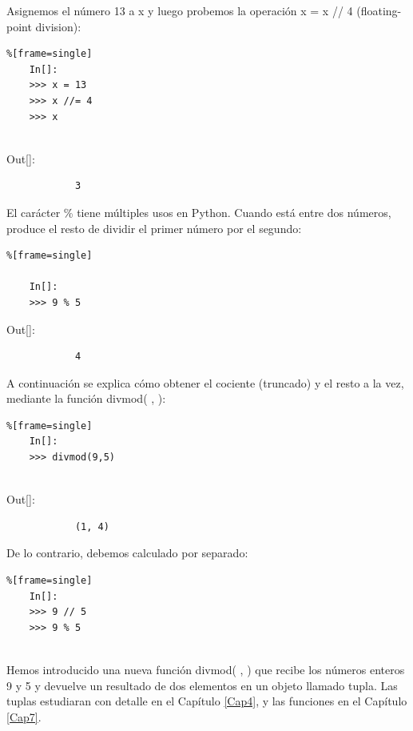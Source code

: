 \hspace{-0.65cm}Asignemos el número  13  a  {\ttfamily x} y luego probemos la operación   {\ttfamily x = x // 4}  (floating-point division):

\begin{lstlisting}%[frame=single]
	In[]:	
	>>> x = 13
	>>> x //= 4
	>>> x
	
\end{lstlisting}

{\ttfamily\scriptsize\scriptsize 
	\hspace{-0.65cm}Out[]:\vspace{-0.15cm}	
	{\color{blue} 	
		\begin{verbatim}
			3
		\end{verbatim}
}}

El carácter  {\hspace{0.1cm}}{\ttfamily \%} tiene múltiples usos en Python. Cuando está entre dos números, produce
el resto de dividir el primer número por el segundo:

\begin{lstlisting}%[frame=single]
	
	In[]:
	>>> 9 % 5	
\end{lstlisting}

{\ttfamily\scriptsize\scriptsize 
	\hspace{-0.65cm}Out[]:\vspace{-0.15cm}	
	{\color{blue} 	
		\begin{verbatim}
			4
		\end{verbatim}
}}

A continuación se explica cómo obtener el cociente (truncado) y el resto a la vez, mediante la función {
	\ttfamily divmod( , )}:

\begin{lstlisting}%[frame=single]
	In[]:	
	>>> divmod(9,5)
	
\end{lstlisting}

{\ttfamily\scriptsize\scriptsize 
	\hspace{-0.65cm}Out[]:\vspace{-0.15cm}	
	{\color{blue} 	
		\begin{verbatim}
			(1, 4)
		\end{verbatim}
}}



\hspace{-0.65cm}De lo contrario, debemos calculado por separado:

\begin{lstlisting}%[frame=single]
	In[]:
	>>> 9 // 5
	>>> 9 % 5
	
\end{lstlisting}
Hemos introducido una nueva función {\ttfamily divmod( , )} que recibe los números enteros 9 y 5 y devuelve un resultado de dos elementos en un objeto llamado tupla. Las tuplas estudiaran con detalle en el Capítulo \ref{Cap4}, y las funciones en el Capítulo \ref{Cap7}.\\



